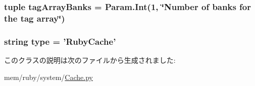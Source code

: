 \label{classCache_1_1RubyCache_a6326c35602f2f8cea6b953033f57f4f6}
\hypertarget{classCache_1_1RubyCache_a794d6c9ff250b147df46c725201c4bbd}{
\subsubsection[{tagArrayBanks}]{\setlength{\rightskip}{0pt plus 5cm}tuple {\bf tagArrayBanks} = Param.Int(1, \char`\"{}Number of banks for the tag array\char`\"{})}}
\label{classCache_1_1RubyCache_a794d6c9ff250b147df46c725201c4bbd}
\hypertarget{classCache_1_1RubyCache_acce15679d830831b0bbe8ebc2a60b2ca}{
\subsubsection[{type}]{\setlength{\rightskip}{0pt plus 5cm}string {\bf type} = '{\bf RubyCache}'}}
\label{classCache_1_1RubyCache_acce15679d830831b0bbe8ebc2a60b2ca}


このクラスの説明は次のファイルから生成されました:\begin{DoxyCompactItemize}
\item 
mem/ruby/system/\hyperlink{Cache_8py}{Cache.py}\end{DoxyCompactItemize}
